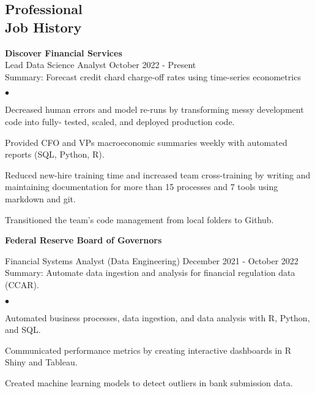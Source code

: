 \documentclass[margin, line]{res}
\newenvironment{list2}{
  \begin{list}{$\bullet$}{%
      \setlength{\itemsep}{0.04in}
      \setlength{\parsep}{0in} \setlength{\parskip}{0in}
      \setlength{\topsep}{0.05in} \setlength{\partopsep}{0in} 
      \setlength{\leftmargin}{\dimexpr 26pt-0.05in}}}
    {\end{list}}
\begin{document}
\begin{resume}
\vspace{-.35cm}


\section{\sc Professional \\ Job History }

{\bf Discover Financial Services}\\

\vspace{-.65cm}
Lead Data Science Analyst \hfill October 2022 - Present\\
\hspace*{3mm} 
    Summary: Forecast credit chard charge-off rates using time-series econometrics
\hspace*{3mm}
    \begin{list2}
        \item Decreased human errors and model re-runs by transforming messy development code into fully- tested, scaled, and deployed production code.
        \item Provided CFO and VPs macroeconomic summaries weekly with automated reports (SQL, Python, R).
        \item Reduced new-hire training time and increased team cross-training by writing and maintaining documentation for more than 15 processes and 7 tools using markdown and git.
        \item Transitioned the team's code management from local folders to Github.
    \end{list2}

{\bf Federal Reserve Board of Governors}\\

\vspace{-.65cm}

Financial Systems Analyst (Data Engineering) \hfill December 2021 - October 2022\\
\hspace*{3mm} 
    Summary: Automate data ingestion and analysis for financial regulation data (CCAR).
\hspace*{3mm}
    \begin{list2}
        \item Automated business processes, data ingestion, and data analysis with R, Python, and SQL.
        \item Communicated performance metrics by creating interactive dashboards in R Shiny and Tableau.
        \item Created machine learning models to detect outliers in bank submission data.
    \end{list2}



\end{resume}
\end{document}
